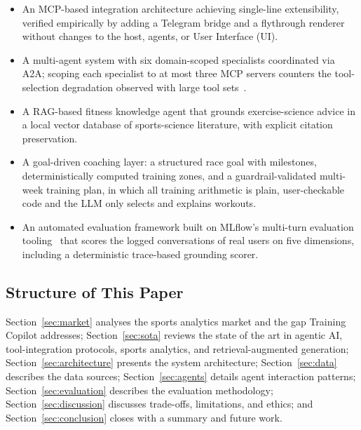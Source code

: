 \begin{itemize}
\item An MCP-based integration architecture achieving single-line extensibility, verified empirically by adding a Telegram bridge and a flythrough renderer without changes to the host, agents, or User Interface (UI).
\item A multi-agent system with six domain-scoped specialists coordinated via A2A; scoping each specialist to at most three MCP servers counters the tool-selection degradation observed with large tool sets~\citep{qu_tool_2024}.
\item A RAG-based fitness knowledge agent that grounds exercise-science advice in a local vector database of sports-science literature, with explicit citation preservation.
\item A goal-driven coaching layer: a structured race goal with milestones, deterministically computed training zones, and a guardrail-validated multi-week training plan, in which all training arithmetic is plain, user-checkable code and the LLM only selects and explains workouts.
\item An automated evaluation framework built on MLflow's multi-turn evaluation tooling~\citep{mlflow_multiturn_2025} that scores the logged conversations of real users on five dimensions, including a deterministic trace-based grounding scorer.
\end{itemize}

\subsection{Structure of This Paper}\label{sec:intro:structure}

Section~\ref{sec:market} analyses the sports analytics market and the gap Training Copilot addresses; Section~\ref{sec:sota} reviews the state of the art in agentic AI, tool-integration protocols, sports analytics, and retrieval-augmented generation; Section~\ref{sec:architecture} presents the system architecture; Section~\ref{sec:data} describes the data sources; Section~\ref{sec:agents} details agent interaction patterns; Section~\ref{sec:evaluation} describes the evaluation methodology; Section~\ref{sec:discussion} discusses trade-offs, limitations, and ethics; and Section~\ref{sec:conclusion} closes with a summary and future work.
